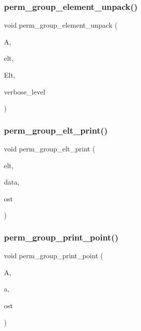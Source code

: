 \subsubsection{\texorpdfstring{perm\+\_\+group\+\_\+element\+\_\+unpack()}{perm\_group\_element\_unpack()}}
{\footnotesize\ttfamily void perm\+\_\+group\+\_\+element\+\_\+unpack (\begin{DoxyParamCaption}\item[{\mbox{\hyperlink{classaction}{action}} \&}]{A,  }\item[{void $\ast$}]{elt,  }\item[{void $\ast$}]{Elt,  }\item[{\mbox{\hyperlink{galois_8h_a09fddde158a3a20bd2dcadb609de11dc}{I\+NT}}}]{verbose\+\_\+level }\end{DoxyParamCaption})}

\mbox{\label{interface__perm__group_8_c_a46edc9ed5e8ff15fad56165dad297e48}} 
\subsubsection{\texorpdfstring{perm\+\_\+group\+\_\+elt\+\_\+print()}{perm\_group\_elt\_print()}}
{\footnotesize\ttfamily void perm\+\_\+group\+\_\+elt\+\_\+print (\begin{DoxyParamCaption}\item[{void $\ast$}]{elt,  }\item[{void $\ast$}]{data,  }\item[{ostream \&}]{ost }\end{DoxyParamCaption})}

\mbox{\label{interface__perm__group_8_c_a057224b2737a65d7590c4e3596d53ce8}} 
\subsubsection{\texorpdfstring{perm\+\_\+group\+\_\+print\+\_\+point()}{perm\_group\_print\_point()}}
{\footnotesize\ttfamily void perm\+\_\+group\+\_\+print\+\_\+point (\begin{DoxyParamCaption}\item[{\mbox{\hyperlink{classaction}{action}} \&}]{A,  }\item[{\mbox{\hyperlink{galois_8h_a09fddde158a3a20bd2dcadb609de11dc}{I\+NT}}}]{a,  }\item[{ostream \&}]{ost }\end{DoxyParamCaption})}

